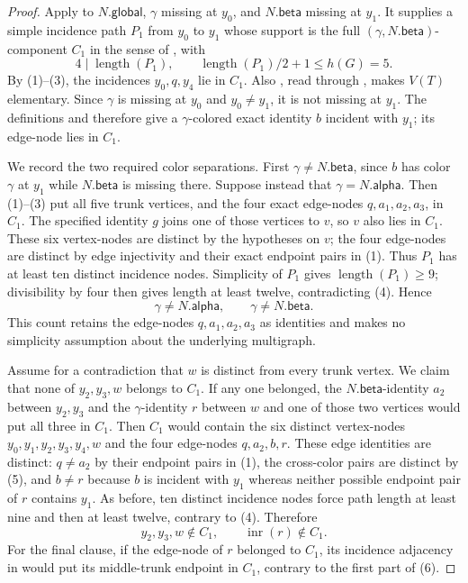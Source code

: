 \begin{proof}
Apply  to $N.\mathsf{global}$,
$\gamma$ missing at $y_0$, and $N.\mathsf{beta}$ missing at $y_1$.
It supplies a simple incidence path $P_1$ from $y_0$ to $y_1$ whose
support is the full $(\gamma,N.\mathsf{beta})$-component $C_1$ in the
sense of , with
\[
 4\mid\operatorname{length}(P_1),\qquad
 \operatorname{length}(P_1)/2+1\leq h(G)=5.          \tag{4}
\]
By (1)--(3), the incidences $y_0,q,y_4$ lie in $C_1$.  Also
, read through
, makes $V(T)$ elementary.  Since
$\gamma$ is missing at $y_0$ and $y_0\ne y_1$, it is not missing at
$y_1$.  The definitions  and
 therefore give a $\gamma$-colored exact identity
$b$ incident with $y_1$; its edge-node lies in $C_1$.

We record the two required color separations.  First
$\gamma\ne N.\mathsf{beta}$, since $b$ has color $\gamma$ at $y_1$ while
$N.\mathsf{beta}$ is missing there.  Suppose instead that
$\gamma=N.\mathsf{alpha}$.  Then (1)--(3) put all five trunk vertices,
and the four exact edge-nodes $q,a_1,a_2,a_3$, in $C_1$.  The specified
identity $g$ joins one of those vertices to $v$, so $v$ also lies in
$C_1$.  These six vertex-nodes are distinct by the hypotheses on $v$;
the four edge-nodes are distinct by edge injectivity and their exact
endpoint pairs in (1).  Thus $P_1$ has at least ten distinct incidence
nodes.  Simplicity of $P_1$ gives
$\operatorname{length}(P_1)\geq9$; divisibility by four then gives length
at least twelve, contradicting (4).  Hence
\[
 \gamma\ne N.\mathsf{alpha},\qquad
 \gamma\ne N.\mathsf{beta}.                         \tag{5}
\]
This count retains the edge-nodes $q,a_1,a_2,a_3$ as identities and makes
no simplicity assumption about the underlying multigraph.

Assume for a contradiction that $w$ is distinct from every trunk vertex.
We claim that none of $y_2,y_3,w$ belongs to $C_1$.  If any one belonged,
the $N.\mathsf{beta}$-identity $a_2$ between $y_2,y_3$ and the
$\gamma$-identity $r$ between $w$ and one of those two vertices would put
all three in $C_1$.  Then $C_1$ would contain the six distinct vertex-nodes
$y_0,y_1,y_2,y_3,y_4,w$ and the four edge-nodes $q,a_2,b,r$.
These edge identities are distinct: $q\ne a_2$ by their endpoint pairs in
(1), the cross-color pairs are distinct by (5), and $b\ne r$ because $b$
is incident with $y_1$ whereas neither possible endpoint pair of $r$
contains $y_1$.  As before, ten distinct incidence nodes force path length
at least nine and then at least twelve, contrary to (4).  Therefore
\[
 y_2,y_3,w\notin C_1,\qquad \operatorname{inr}(r)\notin C_1.             \tag{6}
\]
For the final clause, if the edge-node of $r$ belonged to $C_1$, its
incidence adjacency in  would put its
middle-trunk endpoint in $C_1$, contrary to the first part of (6).


\end{proof}
